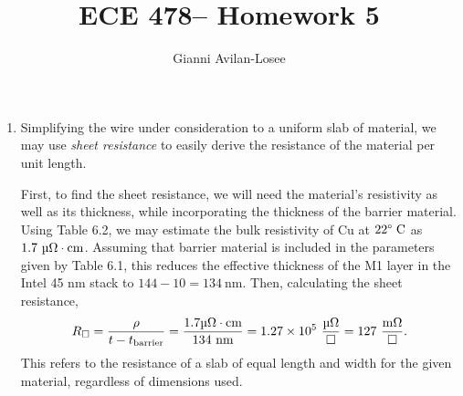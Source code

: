 \documentclass{article}
\title{ECE 478-- Homework 5}
\author{Gianni Avilan-Losee}
\begin{document}
\setcounter{section}{6}
\setcounter{subsection}{1}
\begin{enumerate}[label=\thesubsection]
	\item Simplifying the wire under consideration to a uniform slab of material, we may use \textit{sheet resistance} to easily derive the resistance of the material per unit length.

		First, to find the sheet resistance, we will need the material's resistivity as well as its thickness, while incorporating the thickness of the barrier material. Using Table 6.2, we may estimate the bulk resistivity of Cu at \(22\degree \ \mathrm{C}\) as \(1.7 \ \micro\ohm \cdot \mathrm{cm}\). Assuming that barrier material is included in the parameters given by Table 6.1, this reduces the effective thickness of the M1 layer in the Intel 45 nm stack to \(144 - 10 = 134 \ \mathrm{nm}\). Then, calculating the sheet resistance,
		\[
			R_{\square} = \frac{\rho}{t-t_{\mathrm{barrier}}} = \frac{1.7 \micro\ohm \cdot \mathrm{cm}}{134 \ \mathrm{nm}} = 1.27 \times 10^5 \ \frac{\micro\ohm}{\square} = 127 \ \frac{\mathrm{m}\ohm}{\square}.
		\]
		This refers to the resistance of a slab of equal length and width for the given material, regardless of dimensions used. 


\end{enumerate}
\end{document}
